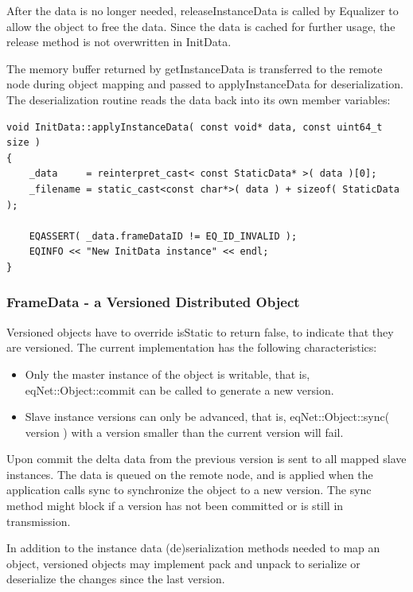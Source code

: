 \documentclass[10pt,a4]{scrartcl}
\begin{document}
After the data is no longer needed, \textsf{releaseInstanceData} is
called by Equalizer to allow the object to free the data. Since the data
is cached for further usage, the release method is not overwritten in
\textsf{InitData}.

The memory buffer returned by \textsf{getInstanceData} is transferred to
the remote node during object mapping and passed to
\textsf{applyInstanceData} for deserialization. The deserialization
routine reads the data back into its own member variables:

{\footnotesize\begin{lstlisting}
void InitData::applyInstanceData( const void* data, const uint64_t size )
{
    _data     = reinterpret_cast< const StaticData* >( data )[0];
    _filename = static_cast<const char*>( data ) + sizeof( StaticData );

    EQASSERT( _data.frameDataID != EQ_ID_INVALID );
    EQINFO << "New InitData instance" << endl;
}
\end{lstlisting}}%

\subsubsection{FrameData - a Versioned Distributed Object}

Versioned objects have to override \textsf{isStatic} to return false, to
indicate that they are versioned. The current implementation has the
following characteristics:
\begin{itemize}
\item Only the master instance of the object is writable, that is,
  \textsf{eqNet::Object::com\-mit} can be called to generate a new
  version.
\item Slave instance versions can only be advanced, that is,
  \textsf{eqNet::Object::sync( version )} with a version smaller than
  the current version will fail.
\end{itemize}

Upon \textsf{commit} the delta data from the previous version is sent to
all mapped slave instances. The data is queued on the remote node, and
is applied when the application calls \textsf{sync} to synchronize the
object to a new version. The \textsf{sync} method might block if a
version has not been committed or is still in transmission.

In addition to the instance data (de)serialization methods needed to map
an object, versioned objects may implement \textsf{pack} and
\textsf{unpack} to serialize or deserialize the changes since the last
version.
\end{document}
